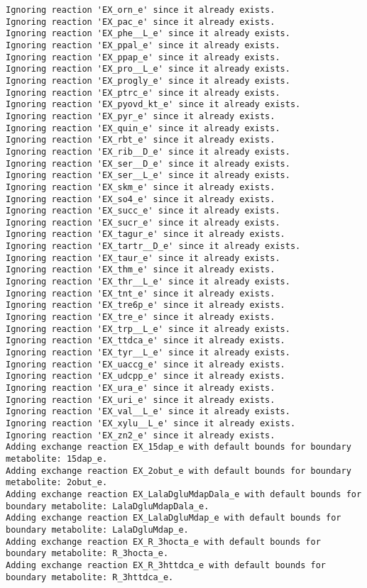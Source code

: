 \documentclass[
  letterpaper,
  DIV=11,
  numbers=noendperiod]{scrartcl}
\begin{document}
\begin{verbatim}
Ignoring reaction 'EX_orn_e' since it already exists.
Ignoring reaction 'EX_pac_e' since it already exists.
Ignoring reaction 'EX_phe__L_e' since it already exists.
Ignoring reaction 'EX_ppal_e' since it already exists.
Ignoring reaction 'EX_ppap_e' since it already exists.
Ignoring reaction 'EX_pro__L_e' since it already exists.
Ignoring reaction 'EX_progly_e' since it already exists.
Ignoring reaction 'EX_ptrc_e' since it already exists.
Ignoring reaction 'EX_pyovd_kt_e' since it already exists.
Ignoring reaction 'EX_pyr_e' since it already exists.
Ignoring reaction 'EX_quin_e' since it already exists.
Ignoring reaction 'EX_rbt_e' since it already exists.
Ignoring reaction 'EX_rib__D_e' since it already exists.
Ignoring reaction 'EX_ser__D_e' since it already exists.
Ignoring reaction 'EX_ser__L_e' since it already exists.
Ignoring reaction 'EX_skm_e' since it already exists.
Ignoring reaction 'EX_so4_e' since it already exists.
Ignoring reaction 'EX_succ_e' since it already exists.
Ignoring reaction 'EX_sucr_e' since it already exists.
Ignoring reaction 'EX_tagur_e' since it already exists.
Ignoring reaction 'EX_tartr__D_e' since it already exists.
Ignoring reaction 'EX_taur_e' since it already exists.
Ignoring reaction 'EX_thm_e' since it already exists.
Ignoring reaction 'EX_thr__L_e' since it already exists.
Ignoring reaction 'EX_tnt_e' since it already exists.
Ignoring reaction 'EX_tre6p_e' since it already exists.
Ignoring reaction 'EX_tre_e' since it already exists.
Ignoring reaction 'EX_trp__L_e' since it already exists.
Ignoring reaction 'EX_ttdca_e' since it already exists.
Ignoring reaction 'EX_tyr__L_e' since it already exists.
Ignoring reaction 'EX_uaccg_e' since it already exists.
Ignoring reaction 'EX_udcpp_e' since it already exists.
Ignoring reaction 'EX_ura_e' since it already exists.
Ignoring reaction 'EX_uri_e' since it already exists.
Ignoring reaction 'EX_val__L_e' since it already exists.
Ignoring reaction 'EX_xylu__L_e' since it already exists.
Ignoring reaction 'EX_zn2_e' since it already exists.
Adding exchange reaction EX_15dap_e with default bounds for boundary metabolite: 15dap_e.
Adding exchange reaction EX_2obut_e with default bounds for boundary metabolite: 2obut_e.
Adding exchange reaction EX_LalaDgluMdapDala_e with default bounds for boundary metabolite: LalaDgluMdapDala_e.
Adding exchange reaction EX_LalaDgluMdap_e with default bounds for boundary metabolite: LalaDgluMdap_e.
Adding exchange reaction EX_R_3hocta_e with default bounds for boundary metabolite: R_3hocta_e.
Adding exchange reaction EX_R_3httdca_e with default bounds for boundary metabolite: R_3httdca_e.

\end{verbatim}
\end{document}
